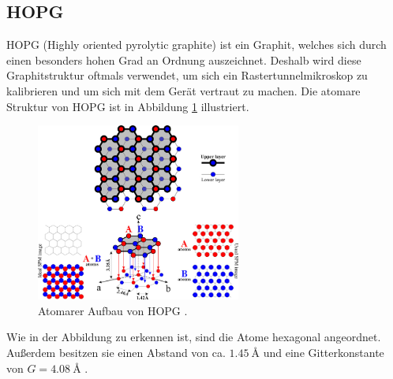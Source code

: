 \subsection{HOPG}
HOPG (Highly oriented pyrolytic graphite) ist ein Graphit, welches sich durch einen besonders hohen Grad
an Ordnung auszeichnet. Deshalb wird diese Graphitstruktur oftmals verwendet, um sich ein Rastertunnelmikroskop zu kalibrieren und
um sich mit dem Gerät vertraut zu machen. %
Die atomare Struktur von HOPG %
ist in Abbildung \ref{fig: hopg} illustriert.
\begin{figure}[!h]
  \centering
  \includegraphics[width=0.6\textwidth]{./pics/hopg.jpg}
  \caption{Atomarer Aufbau von HOPG \cite{hopg}.}
  \label{fig: hopg}
\end{figure}
Wie in der Abbildung zu erkennen ist, sind die Atome hexagonal angeordnet. Außerdem besitzen sie einen Abstand von ca.
$\SI{1.45}{\angstrom}$ \cite{hopg} und eine Gitterkonstante von $G=\SI{4.08}{\angstrom}$ \cite{gitterkonstanten}. %

